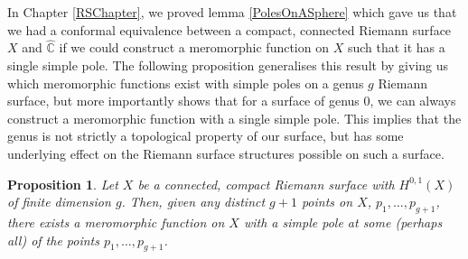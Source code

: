 \documentclass[11pt]{report}
\newtheorem{prop}[thm]{Proposition}
\theoremstyle{definition}
\begin{document}
In Chapter \ref{RSChapter}, we proved lemma \ref{PolesOnASphere} which gave us that we had a conformal equivalence between a compact, connected Riemann surface $X$ and $\widehat{\mathbb{C}}$ if we could construct a meromorphic function on $X$ such that it has a single simple pole. The following proposition generalises this result by giving us which meromorphic functions exist with simple poles on a genus $g$ Riemann surface, but more importantly shows that for a surface of genus $0$, we can always construct a meromorphic function with a single simple pole. This implies that the genus is not strictly a topological property of our surface, but has some underlying effect on the Riemann surface structures possible on such a surface.

\begin{prop}\label{meroFunctionOnGenusGSurface}\label{merofunctions}
  Let $X$ be a connected, compact Riemann surface with $H^{0,1}(X)$ of finite dimension $g$. Then, given any distinct $g+1$ points on $X$, $p_1,\ldots, p_{g+1}$, there exists a meromorphic function on $X$ with a simple pole at some (perhaps all) of the points $p_1,\ldots, p_{g+1}$.
\end{prop} 
\end{document}

